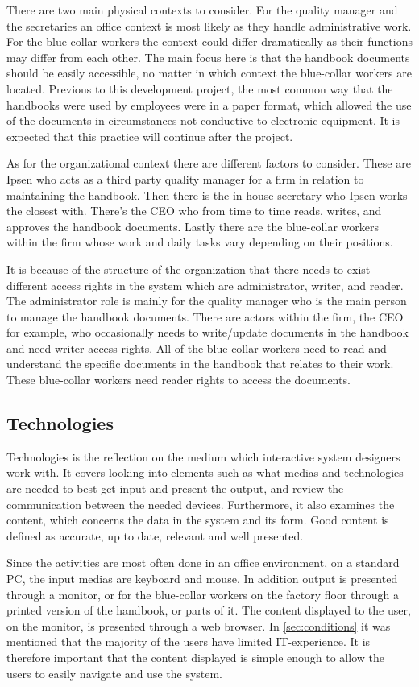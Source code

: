 There are two main physical contexts to consider.
For the quality manager and the secretaries an office context is most likely as they handle administrative work.
For the blue-collar workers the context could differ dramatically as their functions may differ from each other.
The main focus here is that the handbook documents should be easily accessible, no matter in which context the blue-collar workers are located.
Previous to this development project, the most common way that the handbooks were used by employees were in a paper format, which allowed the use of the documents in circumstances not conductive to electronic equipment.
It is expected that this practice will continue after the project.

As for the organizational context there are different factors to consider.
These are Ipsen who acts as a third party quality manager for a firm in relation to maintaining the handbook.
Then there is the in-house secretary who Ipsen works the closest with.
There's the CEO who from time to time reads, writes, and approves the handbook documents.
Lastly there are the blue-collar workers within the firm whose work and daily tasks vary depending on their positions.

It is because of the structure of the organization that there needs to exist different access rights in the system which are administrator, writer, and reader.
The administrator role is mainly for the quality manager who is the main person to manage the handbook documents.
There are actors within the firm, the CEO for example, who occasionally needs to write/update documents in the handbook and need writer access rights.
All of the blue-collar workers need to read and understand the specific documents in the handbook that relates to their work.
These blue-collar workers need reader rights to access the documents.

\subsection{Technologies}
Technologies is the reflection on the medium which interactive system designers work with.
It covers looking into elements such as what medias and technologies are needed to best get input and present the output, and review the communication between the needed devices.
Furthermore, it also examines the content, which concerns the data in the system and its form.
Good content is defined as accurate, up to date, relevant and well presented.

Since the activities are most often done in an office environment, on a standard PC, the input medias are keyboard and mouse.
In addition output is presented through a monitor, or for the blue-collar workers on the factory floor through a printed version of the handbook, or parts of it.
The content displayed to the user, on the monitor, is presented through a web browser.
In \cref{sec:conditions} it was mentioned that the majority of the users have limited IT-experience.
It is therefore important that the content displayed is simple enough to allow the users to easily navigate and use the system.

